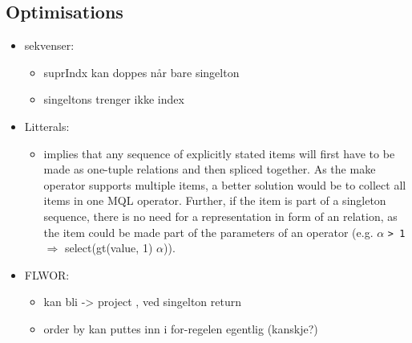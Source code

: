 \subsection{Optimisations}
\label{sect:trans:TD:optimisations}
\begin{itemize}
  \item sekvenser:
	  \begin{itemize}
	    \item suprIndx kan doppes n\aa r bare singelton
	    \item singeltons trenger ikke index
      \end{itemize} 
  \item Litterals: 
		\begin{itemize}
          \item implies that any sequence of
				explicitly stated items will first have to be made as one-tuple relations and
				then spliced together. As the \textsf{make} operator supports multiple items, a
					better solution would be to collect all items in one MQL operator. Further, if
					the item is part of a singleton sequence, there is no need for a representation
					in form of an relation, as the item could be made part of the parameters of an
					operator (e.g. $\alpha$ \texttt{> 1} $\Longrightarrow$
					\textsf{select(gt(value, 1) $\alpha$)}).   
        \end{itemize}
  \item FLWOR:
  	\begin{itemize}
        \item  kan bli -> project , ved singelton return
    	  \item order by kan puttes inn i for-regelen egentlig (kanskje?)
      \end{itemize}         
\end{itemize}